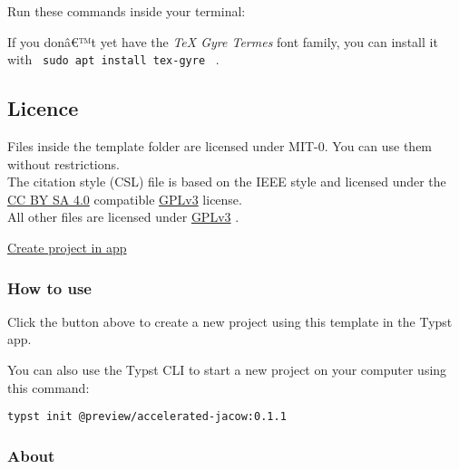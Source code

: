 Run these commands inside your terminal:

\begin{Shaded}
\begin{Highlighting}[]
\end{Highlighting}
\end{Shaded}

If you donâ€™t yet have the \emph{TeX Gyre Termes} font family, you can
install it with \texttt{\ sudo\ apt\ install\ tex-gyre\ } .


\subsection{Licence}\label{licence}

Files inside the template folder are licensed under MIT-0. You can use
them without restrictions.\\
The citation style (CSL) file is based on the IEEE style and licensed
under the \href{https://creativecommons.org/licenses/by-sa/4.0/}{CC BY
SA 4.0} compatible
\href{https://www.gnu.org/licenses/gpl-3.0.html}{GPLv3} license.\\
All other files are licensed under
\href{https://www.gnu.org/licenses/gpl-3.0.html}{GPLv3} .

\href{/app?template=accelerated-jacow&version=0.1.1}{Create project in
app}

\subsubsection{How to use}\label{how-to-use}

Click the button above to create a new project using this template in
the Typst app.

You can also use the Typst CLI to start a new project on your computer
using this command:

\begin{verbatim}
typst init @preview/accelerated-jacow:0.1.1
\end{verbatim}



\subsubsection{About}\label{about}

